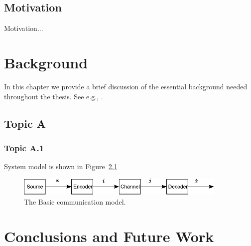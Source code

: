 \documentclass[a4paper]{report}
\begin{document}

\section{Motivation}

Motivation...





\chapter{Background}
In this chapter we provide a brief discussion of the essential background needed throughout the thesis. See e.g., \cite{Cover2006}.


\section{Topic A}



\subsection{Topic A.1}

System model is shown in Figure~\ref{fig:sysModel}

\begin{figure}[!htp]
    \centering
        \includegraphics[width=0.9\textwidth]{./figures/Drawing1}
        \caption{The Basic communication model.}\label{fig:sysModel}
\end{figure}









\chapter{Conclusions and Future Work}









\end{document}
